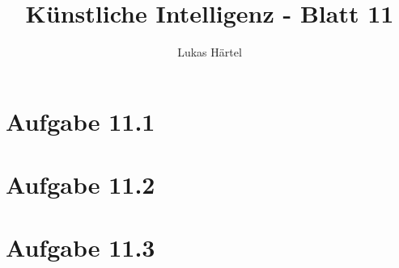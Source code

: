 \documentclass[german,a4paper]{scrartcl}
\title{Künstliche Intelligenz - Blatt 11}
\author{Lukas Härtel}
\date{}
\begin{document}
	\maketitle
	\section*{Aufgabe 11.1}
	
	
	\section*{Aufgabe 11.2}
	
	
	\section*{Aufgabe 11.3}
	
\end{document}
